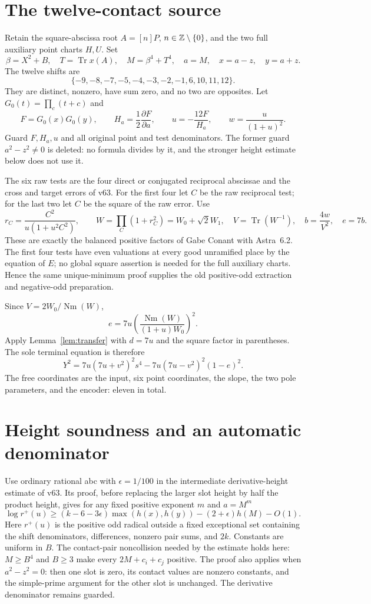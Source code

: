 \documentclass[11pt]{article}
\newcommand{\Tr}{\operatorname{Tr}}\newcommand{\Nm}{\operatorname{Nm}}
\begin{document}
\section{The twelve-contact source}

Retain the square-abscissa root $A=[n]P$, $n\in\mathbb Z\setminus\{0\}$,
and the two full auxiliary point charts $H,U$. Set
\[
 \beta=X^2+B,\quad T=\Tr x(A),\quad M=\beta^4+T^4,\quad a=M,
 \quad x=a-z,\quad y=a+z.
\]
The twelve shifts are
\[
 \{-9,-8,-7,-5,-4,-3,-2,-1,6,10,11,12\}.
\]
They are distinct, nonzero, have sum zero, and no two are opposites.
Let $G_0(t)=\prod_c(t+c)$ and
\[
 F=G_0(x)G_0(y),\qquad
 H_a=\frac12\frac{\partial F}{\partial a},\qquad
 u=-\frac{12F}{H_a},\qquad w=\frac{u}{(1+u)^2}.
\]
Guard $F,H_a,u$ and all original point and test denominators.
The former guard $a^2-z^2\ne0$ is deleted: no formula divides by it,
and the stronger height estimate below does not use it.

The six raw tests are the four direct or conjugated reciprocal
abscissae and the cross and target errors of v63. For the first four
let $C$ be the raw reciprocal test; for the last two let $C$ be the
square of the raw error. Use
\[
 r_C=\frac{C^2}{u(1+u^2C^2)},\qquad
 W=\prod_C(1+r_C^2)=W_0+\sqrt2W_1,
 \quad V=\Tr(W^{-1}),\quad b=\frac{4w}{V^2},\quad e=7b.
\]
These are exactly the balanced positive factors of Gabe Conant with Astra~6.2. The first
four tests have even valuations at every good unramified place by
the equation of $E$; no global square assertion is needed for the
full auxiliary charts. Hence the same unique-minimum proof supplies
the old positive-odd extraction and negative-odd preparation.

Since $V=2W_0/\Nm(W)$,
\[
 e=7u\left(\frac{\Nm(W)}{(1+u)W_0}\right)^2.
\]
Apply Lemma~\ref{lem:transfer} with $d=7u$ and the square factor in
parentheses. The sole terminal equation is therefore
\[
 Y^2=7u(7u+v^2)^2s^4
       -7u(7u-v^2)^2(1-e)^2.                 \tag{1}
\]
The free coordinates are the input, six point coordinates, the slope,
the two pole parameters, and the encoder: eleven in total.

\section{Height soundness and an automatic denominator}

Use ordinary rational abc with $\epsilon=1/100$ in the intermediate
derivative-height estimate of v63. Its proof, before replacing the
larger slot height by half the product height, gives for any fixed
positive exponent $m$ and $a=M^m$
\[
 \log r^+(u)\ge(k-6-3\epsilon)\max(h(x),h(y))
                         -(2+\epsilon)h(M)-O(1).
\]
Here $r^+(u)$ is the positive odd radical outside a fixed exceptional
set containing the shift denominators, differences, nonzero pair sums,
and $2k$. Constants are uniform in $B$. The contact-pair noncollision needed by
the estimate holds here: $M\ge B^4$ and $B\ge3$ make every
$2M+c_i+c_j$ positive.
The proof also applies when $a^2-z^2=0$: then one slot is zero, its
contact values are nonzero constants, and the simple-prime argument
for the other slot is unchanged. The derivative denominator remains
guarded.
\end{document}
